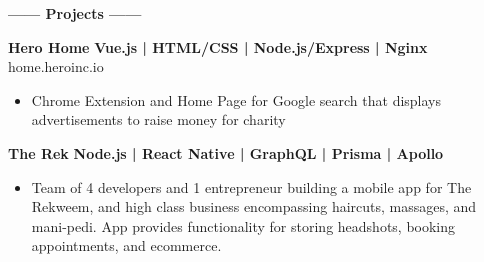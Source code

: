 \documentclass[12pt]{article}
\begin{document}
\colorbox{secondary}{
    \parbox{45em}{
    \color{white}
    \vspace{-2mm}

    \begin{center}
    \textbf{\Large------ Projects ------}\\
    \end{center}
    
    \vspace{-5mm}
    \begin{footnotesize}

    \textbf{\color{primary}\large Hero Home } \hfill \textbf{\color{Cerulean}Vue.js | HTML/CSS | Node.js/Express | Nginx }\\
    {\color{primary}\footnotesize home.heroinc.io}
    \begin{itemize}
        \item Chrome Extension and Home Page for Google search that displays advertisements to raise money for charity
    \end{itemize}


    \flushleft

    \textbf{\color{primary}\large The Rek} \hfill \textbf{\color{Cerulean} Node.js | React Native | GraphQL | Prisma | Apollo}
    \begin{itemize}
        \item Team of 4 developers and 1 entrepreneur building a mobile app for The Rekweem, and high class business encompassing haircuts, massages, and mani-pedi. App provides functionality for storing headshots, booking appointments, and ecommerce.
    \end{itemize}

    \end{footnotesize}
}}

\end{document}
